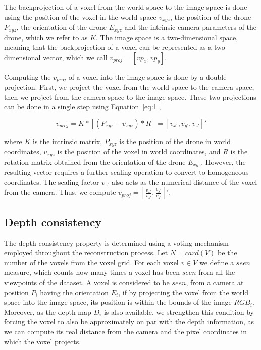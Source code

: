\documentclass{article}
\begin{document}
The backprojection of a voxel from the world space to the image space is done using the position of the voxel in the world space \(v_{xyz}\), the position of the drone \(P_{xyz}\), the orientation of the drone \(E_{xyz}\) and the intrinsic camera parameters of the drone, which we refer to as \(K\). The image space is a two-dimensional space, meaning that the backprojection of a voxel can be represented as a two-dimensional vector, which we call \(v_{proj} = [vp_x, vp_y]\).

Computing the \(v_{proj}\) of a voxel into the image space is done by a double projection. First, we project the voxel from the world space to the camera space, then we project from the camera space to the image space. These two projections can be done in a single step using Equation~\ref{eq:1},

\begin{equation} \label{eq:1}
v_{proj} = K * [(P_{xyz} - v_{xyz}) * R] = [v_{x'}, v_{y'}, v_{z'}]'
\end{equation}

where \(K\) is the intrinsic matrix, \(P_{xyz}\) is the position of the drone in world coordinates, \(v_{xyz}\) is the position of the voxel in world coordinates, and \(R\) is the rotation matrix obtained from the orientation of the drone \(E_{xyz}\). However, the resulting vector requires a further scaling operation to convert to homogeneous coordinates. The scaling factor \(v_{z'}\) also acts as the numerical distance of the voxel from the camera. Thus, we compute \(v_{proj} = [\frac{v_{x'}}{v_{z'}}, \frac{v_{y'}}{v_{z'}}]'\). 

\subsection{Depth consistency} \label{subsec:depth_cons}

The depth consistency property is determined using a voting mechanism employed throughout the reconstruction process. Let \(N = card(V)\) be the number of the voxels from the voxel grid. For each voxel \(v \in V\) we define a \(seen\) measure, which counts how many times a voxel has been \(seen\) from all the viewpoints of the dataset. A voxel is considered to be \(seen\), from a camera at position \(P_i\) having the orientation \(E_i\), if by projecting the voxel from the world space into the image space, its position is within the bounds of the image \(RGB_i\). Moreover, as the depth map \(D_i\) is also available, we strengthen this condition by forcing the voxel to also be approximately on par with the depth information, as we can compute its real distance from the camera and the pixel coordinates in which the voxel projects. 
\end{document}
